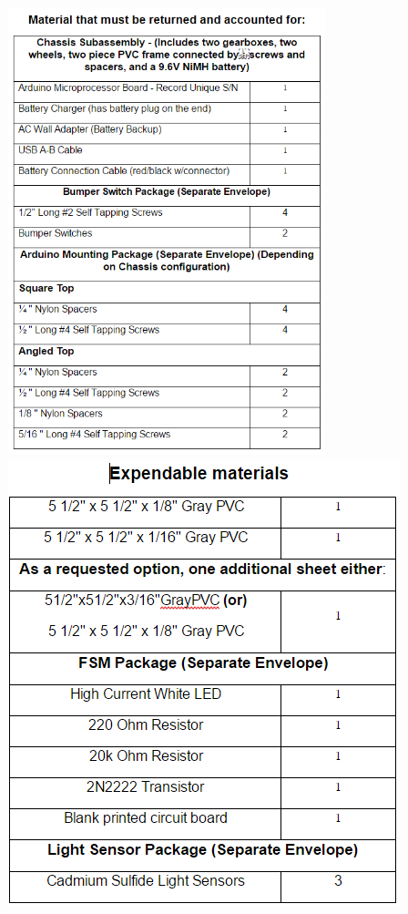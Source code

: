 \documentclass{article}
\begin{document}
\begin{center}{\includegraphics[height=13cm]{ReturnMaterial.png}\\\includegraphics{ExpendableMaterials.png}}\end{center}
\end{document}
